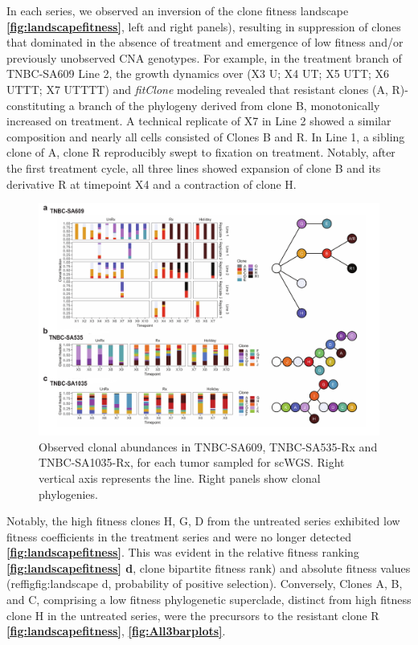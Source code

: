 In each series, we observed an inversion of the clone fitness landscape \textbf{\autoref{fig:landscapefitness}}, left and right panels), resulting in suppression of clones that dominated in the absence of treatment and emergence of low fitness and/or previously unobserved CNA genotypes. For example, in the treatment branch of TNBC-SA609 Line 2, the growth dynamics over (X3 U; X4 UT; X5 UTT; X6 UTTT; X7 UTTTT) and \textit{fitClone} modeling revealed that resistant clones (A, R)- constituting a branch of the phylogeny derived from clone B,  monotonically increased on treatment. A technical replicate of X7 in Line 2 showed a similar composition and nearly all cells consisted of Clones B and R.  In Line 1, a sibling clone of A, clone R reproducibly swept to fixation on treatment. Notably, after the first treatment cycle, all three lines showed expansion of clone B and its derivative R at timepoint X4 and a contraction of clone H.



\begin{figure}
\centering
\includegraphics[width=\textwidth]{Figures/All3barplots.pdf}
\caption[Summary of number of genes \textit{in-cis} and \textit{in-trans}]
	{\small
	\textbf{}
	Observed clonal abundances in TNBC-SA609, TNBC-SA535-Rx and TNBC-SA1035-Rx, for each tumor sampled for scWGS. Right vertical axis represents the line. Right panels show clonal phylogenies.
}
    \label{fig:All3barplots}
    \end{figure}

Notably, the high fitness clones H, G, D from the untreated series exhibited low fitness coefficients in the treatment series and were no longer detected \textbf{\autoref{fig:landscapefitness}}. This was evident in the relative fitness ranking \textbf{\autoref{fig:landscapefitness} d}, clone bipartite fitness rank) and absolute fitness values (reffig{fig:landscape} d, probability of positive selection). Conversely, Clones A, B,  and C, comprising a low fitness phylogenetic superclade, distinct from high fitness clone H in the untreated series, were the precursors to the resistant clone R \textbf{\autoref{fig:landscapefitness}}, \textbf{\autoref{fig:All3barplots}}. 

